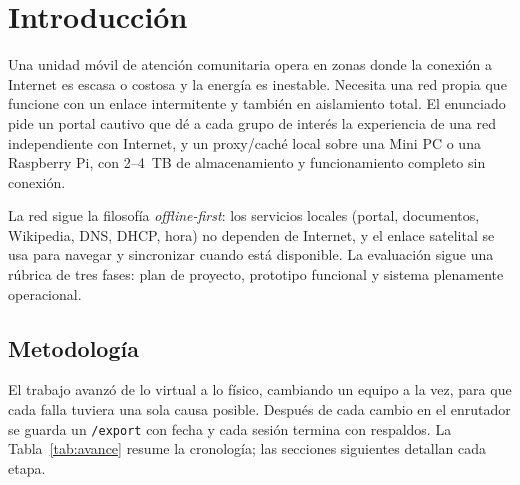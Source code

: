 \documentclass[conference]{IEEEtran}
\begin{document}
\section{Introducción}
Una unidad móvil de atención comunitaria opera en zonas donde la conexión a Internet es escasa o costosa y la energía es inestable. Necesita una red propia que funcione con un enlace intermitente y también en aislamiento total. El enunciado pide un portal cautivo que dé a cada grupo de interés la experiencia de una red independiente con Internet, y un proxy/caché local sobre una Mini PC o una Raspberry Pi, con 2--4~TB de almacenamiento y funcionamiento completo sin conexión.

La red sigue la filosofía \textit{offline-first}: los servicios locales (portal, documentos, Wikipedia, DNS, DHCP, hora) no dependen de Internet, y el enlace satelital se usa para navegar y sincronizar cuando está disponible. La evaluación sigue una rúbrica de tres fases: plan de proyecto, prototipo funcional y sistema plenamente operacional.

\subsection{Metodología}
El trabajo avanzó de lo virtual a lo físico, cambiando un equipo a la vez, para que cada falla tuviera una sola causa posible. Después de cada cambio en el enrutador se guarda un \texttt{/export} con fecha y cada sesión termina con respaldos. La Tabla~\ref{tab:avance} resume la cronología; las secciones siguientes detallan cada etapa.
\end{document}
